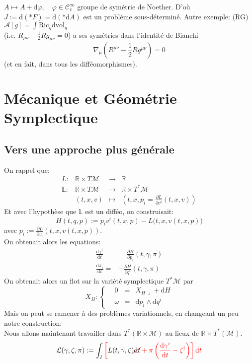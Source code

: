 \documentclass[a4paper,11pt]{article}
\renewcommand{\d}{{\mathrm{d}}}
\newcommand{\dr}[2]{\frac{\partial {#1}}{\partial{#2}}}
\begin{document}
$A\mapsto A+\d \varphi,\quad \varphi\in \mathcal{C}^\infty_\mathrm{c}$ groupe de symétrie de Noether. D'où $J:=\d (*F) = \d (*\d A)$ est un problème sous-déterminé.
Autre exemple: (RG) $\mathcal{A}[g] = \int \mathrm{Ric}_g \d\mathrm{vol}_g$\\
(i.e. $R_{\mu\nu}-\frac{1}{2}Rg_{\mu\nu} = 0$) a ses symétries dans l'identité de Bianchi
$$\nabla_\mu \left(R^{\mu\nu}-\frac{1}{2}Rg^{\mu\nu}\right)=0$$
(et en fait, dans tous les difféomorphismes).

\section{Mécanique et Géométrie Symplectique}
\subsection{Vers une approche plus générale}
On rappel que:
$$\begin{matrix}
L: & \mathbb{R}\times T\mathcal{M} & \to & \mathbb{R}\\
\mathbb{L}: &  \mathbb{R}\times T\mathcal{M} & \to & \mathbb{R}\times T^*\mathcal{M}\\
& (t,x,v) &\mapsto &\left(t,x, p_i = \dr L{v^i}(t,x,v)\right)
\end{matrix}$$
Et avec l'hypothèse que $\mathbb{L}$ est un difféo, on construisait:
$$H(t,q,p):=p_iv^i(t,x,p)-L\big(t,x,v(t,x,p)\big)$$
avec $p_i:= \dr L{v_i}(t,x,v(t,x,p))$.\\
On obtenait alors les equations:
\begin{align*}
\frac{\d \gamma^i}{\d t} =& \quad \, \dr H{p_i}(t,\gamma, \pi)\\
\frac{\d \pi_i}{\d t} =& - \dr H{q^i}(t,\gamma, \pi)
\end{align*}
On obtenait alors un flot sur la variété symplectique $T^*\mathcal{M}$ par
$$X_H : \left\{\quad \begin{matrix}
0 & = & X_H \lrcorner + \d H\\
\omega & = & \d p_i \wedge \d q^i
\end{matrix}\right.$$
Mais on peut se ramener à des problèmes variationnels, en changeant un peu notre construction:\\
Nous allons maintenant travailler dans $T^*(\mathbb{R}\times\mathcal{M})$ au lieux de $\mathbb{R}\times T^*(\mathcal{M})$.
$$\mathcal{L}(\gamma,\zeta,\pi) := \int_I \color{red}\left[\color{black}L(t,\gamma,\zeta) \color{red}\cancel{\color{black}\d  t} + \pi \left( \frac{\d \gamma^i}{\d t} - \zeta^i\right)\right]\d t$$
\end{document}
